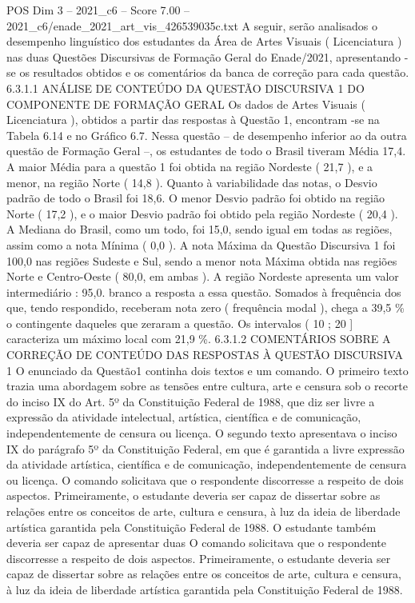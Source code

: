 \begin{textsample}{POS Dim 3 – 2021\_c6 – Score 7.00 – 2021\_c6/enade\_2021\_art\_vis\_426539035c.txt}
A seguir, serão analisados o desempenho linguístico dos estudantes da Área de Artes Visuais ( Licenciatura ) nas duas Questões Discursivas de Formação Geral do Enade/2021, apresentando -se os resultados obtidos e os comentários da banca de correção para cada questão. 6.3.1.1 ANÁLISE DE CONTEÚDO DA QUESTÃO DISCURSIVA 1 DO COMPONENTE DE FORMAÇÃO GERAL Os dados de Artes Visuais ( Licenciatura ), obtidos a partir das respostas à Questão 1, encontram -se na Tabela 6.14 e no Gráfico 6.7.
Nessa questão – de desempenho inferior ao da outra questão de Formação Geral –, os estudantes de todo o Brasil tiveram Média 17,4.
A maior Média para a questão 1 foi obtida na região Nordeste ( 21,7 ), e a menor, na região Norte ( 14,8 ).
Quanto à variabilidade das notas, o Desvio padrão de todo o Brasil foi 18,6.
O menor Desvio padrão foi obtido na região Norte ( 17,2 ), e o maior Desvio padrão foi obtido pela região Nordeste ( 20,4 ).
A Mediana do Brasil, como um todo, foi 15,0, sendo igual em todas as regiões, assim como a nota Mínima ( 0,0 ).
A nota Máxima da Questão Discursiva 1 foi 100,0 nas regiões Sudeste e Sul, sendo a menor nota Máxima obtida nas regiões Norte e Centro-Oeste ( 80,0, em ambas ).
A região Nordeste apresenta um valor intermediário : 95,0. branco a resposta a essa questão.
Somados à frequência dos que, tendo respondido, receberam nota zero ( frequência modal ), chega a 39,5 \% o contingente daqueles que zeraram a questão.
Os intervalos ( 10 ; 20 ] caracteriza um máximo local com 21,9 \%. 6.3.1.2 COMENTÁRIOS SOBRE A CORREÇÃO DE CONTEÚDO DAS RESPOSTAS À QUESTÃO DISCURSIVA 1 O enunciado da Questão1 continha dois textos e um comando.
O primeiro texto trazia uma abordagem sobre as tensões entre cultura, arte e censura sob o recorte do inciso IX do Art. 5º da Constituição Federal de 1988, que diz ser livre a expressão da atividade intelectual, artística, científica e de comunicação, independentemente de censura ou licença.
O segundo texto apresentava o inciso IX do parágrafo 5º da Constituição Federal, em que é garantida a livre expressão da atividade artística, científica e de comunicação, independentemente de censura ou licença.
O comando solicitava que o respondente discorresse a respeito de dois aspectos.
Primeiramente, o estudante deveria ser capaz de dissertar sobre as relações entre os conceitos de arte, cultura e censura, à luz da ideia de liberdade artística garantida pela Constituição Federal de 1988.
O estudante também deveria ser capaz de apresentar duas O comando solicitava que o respondente discorresse a respeito de dois aspectos.
Primeiramente, o estudante deveria ser capaz de dissertar sobre as relações entre os conceitos de arte, cultura e censura, à luz da ideia de liberdade artística garantida pela Constituição Federal de 1988.

\end{textsample}
